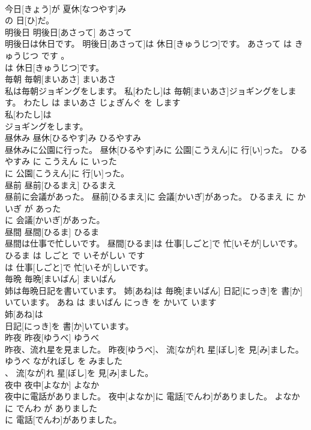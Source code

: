 \documentclass[8pt]{extreport}
\begin{document}
\begin{CJK}{UTF8}{min}
\\	今日[きょう]が 夏休[なつやす]み
\\	の 日[ひ]だ。			
\\	明後日	明後日[あさって]	あさって	
\\	明後日は休日です。	明後日[あさって]は 休日[きゅうじつ]です。	あさって は きゅうじつ です 。	
\\	は 休日[きゅうじつ]です。			
\\	毎朝	毎朝[まいあさ]	まいあさ	
\\	私は毎朝ジョギングをします。	私[わたし]は 毎朝[まいあさ]ジョギングをします。	わたし は まいあさ じょぎんぐ を します	
\\	私[わたし]は
\\	ジョギングをします。			
\\	昼休み	昼休[ひるやす]み	ひるやすみ	
\\	昼休みに公園に行った。	昼休[ひるやす]みに 公園[こうえん]に 行[い]った。	ひるやすみ に こうえん に いった	
\\	に 公園[こうえん]に 行[い]った。			
\\	昼前	昼前[ひるまえ]	ひるまえ	
\\	昼前に会議があった。	昼前[ひるまえ]に 会議[かいぎ]があった。	ひるまえ に かいぎ が あった	
\\	に 会議[かいぎ]があった。			
\\	昼間	昼間[ひるま]	ひるま	
\\	昼間は仕事で忙しいです。	昼間[ひるま]は 仕事[しごと]で 忙[いそが]しいです。	ひるま は しごと で いそがしい です	
\\	は 仕事[しごと]で 忙[いそが]しいです。			
\\	毎晩	毎晩[まいばん]	まいばん	
\\	姉は毎晩日記を書いています。	姉[あね]は 毎晩[まいばん] 日記[にっき]を 書[か]いています。	あね は まいばん にっき を かいて います	
\\	姉[あね]は
\\	日記[にっき]を 書[か]いています。			
\\	昨夜	昨夜[ゆうべ]	ゆうべ	
\\	昨夜、流れ星を見ました。	昨夜[ゆうべ]、 流[なが]れ 星[ぼし]を 見[み]ました。	ゆうべ ながれぼし を みました	
\\	、 流[なが]れ 星[ぼし]を 見[み]ました。			
\\	夜中	夜中[よなか]	よなか	
\\	夜中に電話がありました。	夜中[よなか]に 電話[でんわ]がありました。	よなか に でんわ が ありました	
\\	に 電話[でんわ]がありました。			

\end{CJK}
\end{document}
